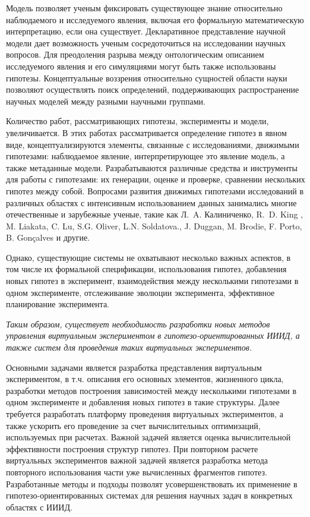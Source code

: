Модель позволяет ученым фиксировать существующее знание относительно наблюдаемого и исследуемого явления, включая 
его формальную математическую интерпретацию, если она существует. Декларативное представление научной модели дает 
возможность ученым сосредоточиться на исследовании научных вопросов. Для преодоления разрыва между онтологическим 
описанием исследуемого явления и его симуляциями могут быть также использованы гипотезы. Концептуальные воззрения 
относительно сущностей области науки позволяют осуществлять поиск определений, поддерживающих распространение 
научных моделей между разными научными группами. 

Количество работ, рассматривающих гипотезы, эксперименты и модели, увеличивается. В этих работах 
рассматривается определение гипотез в явном виде, концептуализируются элементы, связанные с исследованиями, 
движимыми гипотезами: наблюдаемое явление, интерпретирующее это явление модель, а также метаданные модели. 
Разрабатываются различные средства и инструменты для работы с гипотезами: их генерации, оценке и проверке, 
сравнении нескольких гипотез между собой. Вопросами развития движимых гипотезами исследований в различных 
областях с интенсивным использованием данных занимались многие отечественные и зарубежные ученые, такие 
как Л.~A. Калиниченко, R.~D. King , M. Liakata, C. Lu, S.G. Oliver, L.N. Soldatova., J. Duggan, M. Brodie, 
F. Porto, B. Gonçalves и другие. 

Однако, существующие системы не охватывают несколько важных аспектов, в том числе их формальной спецификации, 
использования гипотез, добавления новых гипотез в эксперимент, взаимодействия между несколькими гипотезами в 
одном эксперименте, отслеживание эволюции эксперимента, эффективное планирование эксперимента. 

\textit{Таким образом, существует необходимость разработки новых методов управления виртуальным экспериментом 
 в гипотезо-ориентированных ИИИД, а также систем для проведения таких виртуальных экспериментов.}
 
Основными задачами является разработка представления виртуальным экспериментом, в т.ч. описания его основных 
элементов, жизненного цикла, разработки методов построения зависимостей между несколькими гипотезами в одном 
эксперименте и добавления новых гипотез в такие структуры. Далее требуется разработать платформу 
проведения виртуальных экспериментов, а также ускорить его проведение за счет вычислительных оптимизаций, 
используемых при расчетах. Важной задачей является оценка вычислительной эффективности построения структур гипотез. 
При повторном расчете виртуальных экспериментов важной задачей является разработка 
метода повторного использования части уже вычисленных фрагментов гипотез. 
Разработанные методы и подходы позволят 
усовершенствовать их применение в гипотезо-ориентированных системах для решения научных задач 
в конкретных областях с ИИИД.


